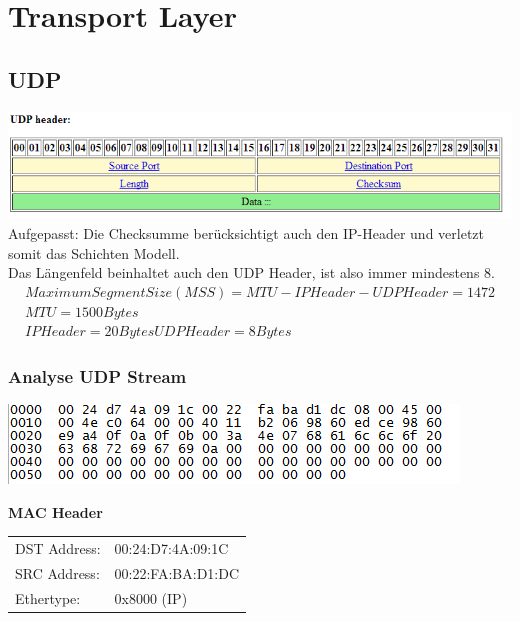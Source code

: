 \section{Transport Layer}

\subsection{UDP}

\includegraphics[scale=0.8]{media/UDPHeader.png}
Aufgepasst: Die Checksumme berücksichtigt auch den IP-Header und verletzt somit das Schichten Modell. \\
Das Längenfeld beinhaltet auch den UDP Header, ist also immer mindestens 8.
\\
\begin{align*}
Maximum Segment Size (MSS) = MTU - IPHeader - UDP Header = 1472\\
MTU = 1500Bytes\\
IPHeader = 20 Bytes
UDPHeader = 8Bytes
\end{align*}

\subsubsection{Analyse UDP Stream}

\includegraphics[scale=1.0]{media/UDPStream.png}

\textbf{MAC Header}\\
\begin{tabular}[h]{ll}
DST Address: & 00:24:D7:4A:09:1C\\
SRC Address: & 00:22:FA:BA:D1:DC\\
Ethertype: & 0x8000 (IP)\\
\end{tabular}


